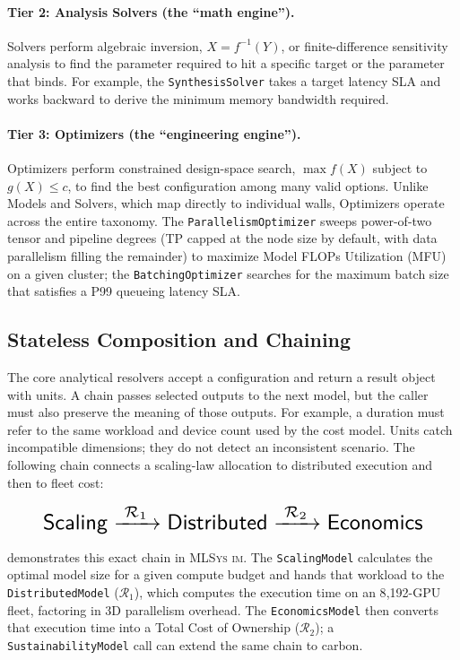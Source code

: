 \documentclass[10pt,twocolumn]{article}
\newcommand{\mlsysim}{\mbox{\textsc{MLSys}\,\textperiodcentered\,\textsc{im}}\xspace}
\begin{document}
\paragraph{Tier 2: Analysis Solvers (the ``math engine'').} Solvers perform algebraic inversion, $X = f^{-1}(Y)$, or finite-difference sensitivity analysis to find the parameter required to hit a specific target or the parameter that binds. For example, the \texttt{SynthesisSolver} takes a target latency SLA and works backward to derive the minimum memory bandwidth required.

\paragraph{Tier 3: Optimizers (the ``engineering engine'').} Optimizers perform constrained design-space search, $\max f(X)$ subject to $g(X) \le c$, to find the best configuration among many valid options. Unlike Models and Solvers, which map directly to individual walls, Optimizers operate across the entire taxonomy. The \texttt{ParallelismOptimizer} sweeps power-of-two tensor and pipeline degrees (TP capped at the node size by default, with data parallelism filling the remainder) to maximize Model FLOPs Utilization (MFU) on a given cluster; the \texttt{BatchingOptimizer} searches for the maximum batch size that satisfies a P99 queueing latency SLA.

\subsection{Stateless Composition and Chaining}
\label{sec:solvers-compose}

The core analytical resolvers accept a configuration and return a result object with units. A chain passes selected outputs to the next model, but the caller must also preserve the meaning of those outputs. For example, a duration must refer to the same workload and device count used by the cost model. Units catch incompatible dimensions; they do not detect an inconsistent scenario. The following chain connects a scaling-law allocation to distributed execution and then to fleet cost:

\begin{equation}
\label{eq:chain}
\resizebox{0.88\columnwidth}{!}{$\displaystyle
\mathsf{Scaling} \xrightarrow{\;\mathcal{R}_1\;} \mathsf{Distributed} \xrightarrow{\;\mathcal{R}_2\;} \mathsf{Economics}
$}
\end{equation}

 demonstrates this exact chain in \mlsysim. The \texttt{ScalingModel} calculates the optimal model size for a given compute budget and hands that workload to the \texttt{DistributedModel} ($\mathcal{R}_1$), which computes the execution time on an 8{,}192-GPU fleet, factoring in 3D parallelism overhead. The \texttt{EconomicsModel} then converts that execution time into a Total Cost of Ownership ($\mathcal{R}_2$); a \texttt{SustainabilityModel} call can extend the same chain to carbon.
\end{document}
